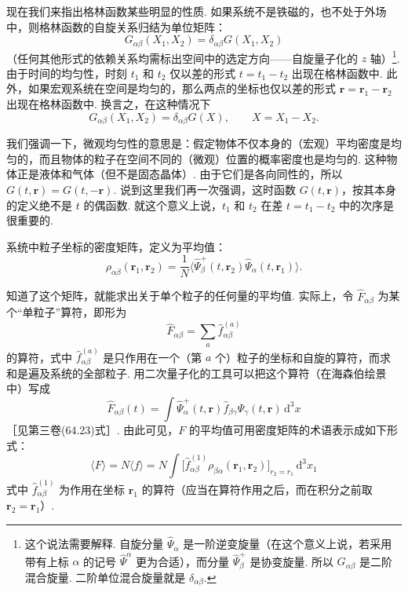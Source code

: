 现在我们来指出格林函数某些明显的性质. 如果系统不是铁磁的，也不处于外场中，则格林函数的自旋关系归结为单位矩阵：
\begin{equation}
G_{\alpha\beta}(X_1,X_2)=\delta_{\alpha\beta}G(X_1,X_2)
\end{equation}
（任何其他形式的依赖关系均需标出空间中的选定方向——自旋量子化的 $z$ 轴）\footnote{这个说法需要解释. 自旋分量 $\hat\Psi_{\alpha}$ 是一阶逆变旋量（在这个意义上说，若采用带有上标 $\alpha$ 的记号 $\hat\Psi^{\alpha}$ 更为合适），而分量 $\hat\Psi^{+}_{\beta}$ 是协变旋量. 所以 $G_{\alpha\beta}$ 是二阶混合旋量. 二阶单位混合旋量就是 $\delta_{\alpha\beta}$.}. 由于时间的均匀性，时刻 $t_1$ 和 $t_2$ 仅以差的形式 $t=t_1-t_2$ 出现在格林函数中. 此外，如果宏观系统在空间是均匀的，那么两点的坐标也仅以差的形式 $\bm r=\bm r_1-\bm r_2$ 出现在格林函数中. 换言之，在这种情况下
\begin{equation}
G_{\alpha\beta}(X_1,X_2)=\delta_{\alpha\beta}G(X),\qquad X=X_1-X_2.
\end{equation}

我们强调一下，微观均匀性的意思是：假定物体不仅本身的（宏观）平均密度是均匀的，而且物体的粒子在空间不同的（微观）位置的概率密度也是均匀的. 这种物体正是液体和气体（但不是固态晶体）. 由于它们是各向同性的，所以 $G(t,\bm r)=G(t,-\bm r)$. 说到这里我们再一次强调，这时函数 $G(t,\bm r)$，按其本身的定义绝不是 $t$ 的偶函数. 就这个意义上说，$t_1$ 和 $t_2$ 在差 $t=t_1-t_2$ 中的次序是很重要的.

系统中粒子坐标的密度矩阵，定义为平均值：
\begin{equation}
\rho_{\alpha\beta}(\bm r_1,\bm r_2)=\frac{1}{N}\big\langle\hat\Psi^{+}_\beta(t,\bm r_2)\hat\Psi_\alpha(t,\bm r_1)\big\rangle.
\end{equation}

知道了这个矩阵，就能求出关于单个粒子的任何量的平均值. 实际上，令 $\hat F_{\alpha\beta}$ 为某个“单粒子”算符，即形为
\begin{equation}
\hat F_{\alpha\beta}=\sum_a\hat f^{(a)}_{\alpha\beta}
\end{equation}
的算符，式中 $\hat f^{(a)}_{\alpha\beta}$ 是只作用在一个（第 $a$ 个）粒子的坐标和自旋的算符，而求和是遍及系统的全部粒子. 用二次量子化的工具可以把这个算符（在海森伯绘景中）写成
\begin{equation}
\hat F_{\alpha\beta}(t)=\int\hat\Psi^{+}_\alpha(t,\bm r)\hat f_{\beta\gamma}\hat\Psi_\gamma(t,\bm r)\,\mathrm{d}^3x
\end{equation}
［见第三卷(64.23)式］. 由此可见，$F$ 的平均值可用密度矩阵的术语表示成如下形式：
\begin{equation}
\langle F\rangle=N\langle f\rangle=N\int\big[\hat f^{(1)}_{\alpha\beta}\rho_{\beta\alpha}(\bm r_1,\bm r_2)\big]_{r_2=r_1}\,\mathrm{d}^3x_1
\end{equation}
式中 $\hat f^{(1)}_{\alpha\beta}$ 为作用在坐标 $\bm r_1$ 的算符（应当在算符作用之后，而在积分之前取 $\bm r_2=\bm r_1$）.

